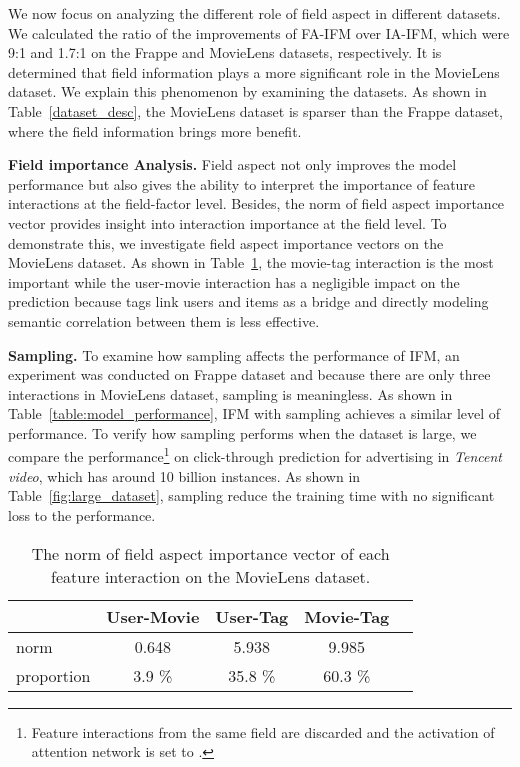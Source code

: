 \documentclass[letterpaper]{article} \usepackage{aaai19}  \usepackage{times}  \usepackage{helvet}  \usepackage{courier}  \usepackage{url}  \usepackage{graphicx}  \frenchspacing  \setlength{\pdfpagewidth}{8.5in}  \setlength{\pdfpageheight}{11in}  \usepackage{mathtools}
\begin{document}
We now focus on analyzing the different role of field aspect in different datasets. 
We calculated the ratio of the improvements of FA-IFM over IA-IFM, which were 9:1 and 1.7:1 on the Frappe and MovieLens datasets, respectively.
It is determined that field information plays a more significant role in the MovieLens dataset. We explain this phenomenon by examining the datasets. As shown in Table~\ref{dataset_desc}, the MovieLens dataset is sparser than the Frappe dataset, where the field information brings more benefit\cite{juan2016field}.

\textbf{Field importance Analysis.} Field aspect not only improves the model performance but also gives the ability to interpret the importance of feature interactions at the field-factor level. Besides, the norm of field aspect importance vector provides insight into interaction importance at the field level. To demonstrate this, we investigate field aspect importance vectors on the MovieLens dataset. As shown in Table~\ref{table:field_analysis}, the movie-tag interaction is the most important while the user-movie interaction has a negligible impact on the prediction because tags link users and items as a bridge\cite{chen2016capturing} and directly modeling semantic correlation between them is less effective.

\textbf{Sampling.} To examine how sampling affects the performance of IFM, an experiment was conducted on Frappe dataset and because there are only three interactions in MovieLens dataset, sampling is meaningless. As shown in Table~\ref{table:model_performance}, IFM with sampling achieves a similar level of performance. 
To verify how sampling performs when the dataset is large, we compare the performance\footnote{Feature interactions from the same field are discarded and the activation of attention network is set to .} on click-through prediction for advertising in \emph{Tencent video}, which has around 10 billion instances. As shown in Table~\ref{fig:large_dataset}, sampling reduce the training time with no significant loss to the performance.

\begin{table}[t]
\caption{The norm of field aspect importance vector of each feature interaction on the MovieLens dataset.} \label{table:field_analysis}

\begin{center}
\begin{small} 
\begin{sc} 
\begin{tabular}{lcccr} 
\hline
 & User-Movie & User-Tag & Movie-Tag \\ 
\hline 
norm & 0.648 & 5.938 & 9.985 \\ 
proportion & 3.9 \% &  35.8 \% &  60.3 \% \\
\hline \end{tabular} \end{sc} \end{small} \end{center} \end{table} 
\end{document}
